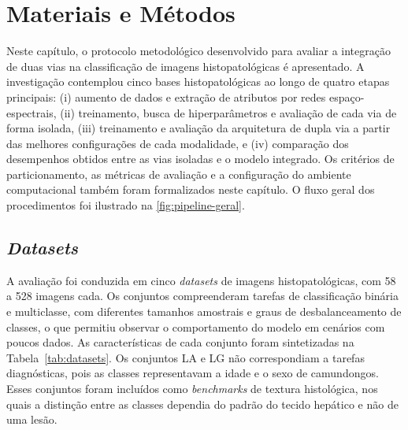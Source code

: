 \chapter{Materiais e Métodos}

Neste capítulo, o protocolo metodológico desenvolvido para avaliar a integração de duas vias na classificação de imagens histopatológicas é apresentado. A investigação contemplou cinco bases histopatológicas ao longo de quatro etapas principais: (i) aumento de dados e extração de atributos por redes espaço-espectrais, (ii) treinamento, busca de hiperparâmetros e avaliação de cada via de forma isolada, (iii) treinamento e avaliação da arquitetura de dupla via a partir das melhores configurações de cada modalidade, e (iv) comparação dos desempenhos obtidos entre as vias isoladas e o modelo integrado. Os critérios de particionamento, as métricas de avaliação e a configuração do ambiente computacional também foram formalizados neste capítulo. O fluxo geral dos procedimentos foi ilustrado na \ref{fig:pipeline-geral}.

 

\section{\textit{Datasets}}
\label{sec:datasets}

A avaliação foi conduzida em cinco \textit{datasets} de imagens histopatológicas, com 58 a 528 imagens cada. Os conjuntos compreenderam tarefas de classificação binária e multiclasse, com diferentes tamanhos amostrais e graus de desbalanceamento de classes, o que permitiu observar o comportamento do modelo em cenários com poucos dados. As características de cada conjunto foram sintetizadas na Tabela~\ref{tab:datasets}. Os conjuntos LA e LG não correspondiam a tarefas diagnósticas, pois as classes representavam a idade e o sexo de camundongos. Esses conjuntos foram incluídos como \textit{benchmarks} de textura histológica, nos quais a distinção entre as classes dependia do padrão do tecido hepático e não de uma lesão.

